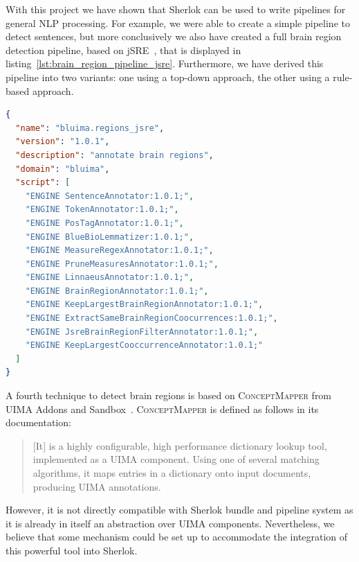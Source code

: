 \documentclass{article}
\newcommand{\ID}[1]{{\textsc{#1}}}
\begin{document}
With this project we have shown that Sherlok can be used to write pipelines for general NLP
processing. For example, we were able to create a simple pipeline to detect sentences, but more
conclusively we also have created a full brain region detection pipeline, based on
jSRE~\cite{jsre_2006}, that is displayed in listing~\ref{lst:brain_region_pipeline_jsre}.
Furthermore, we have derived this pipeline into two variants: one using a top-down approach, the
other using a rule-based approach.

\begin{lstlisting}[float,language=json,
                   caption=jSRE brain region pipeline,
                   label=lst:brain_region_pipeline_jsre]
{
  "name": "bluima.regions_jsre",
  "version": "1.0.1",
  "description": "annotate brain regions",
  "domain": "bluima",
  "script": [
    "ENGINE SentenceAnnotator:1.0.1;",
    "ENGINE TokenAnnotator:1.0.1;",
    "ENGINE PosTagAnnotator:1.0.1;",
    "ENGINE BlueBioLemmatizer:1.0.1;",
    "ENGINE MeasureRegexAnnotator:1.0.1;",
    "ENGINE PruneMeasuresAnnotator:1.0.1;",
    "ENGINE LinnaeusAnnotator:1.0.1;",
    "ENGINE BrainRegionAnnotator:1.0.1;",
    "ENGINE KeepLargestBrainRegionAnnotator:1.0.1;",
    "ENGINE ExtractSameBrainRegionCoocurrences:1.0.1;",
    "ENGINE JsreBrainRegionFilterAnnotator:1.0.1;",
    "ENGINE KeepLargestCooccurrenceAnnotator:1.0.1;"
  ]
}
\end{lstlisting}

A fourth technique to detect brain regions is based on \ID{ConceptMapper} from UIMA Addons and
Sandbox~\cite{uima_sandbox}. \ID{ConceptMapper} is defined as follows in its documentation:

\begin{quotation}
    [It] is a highly configurable, high performance dictionary lookup tool, implemented as a UIMA
    component. Using one of several matching algorithms, it maps entries in a dictionary onto input
    documents, producing UIMA annotations.
\end{quotation}

However, it is not directly compatible with Sherlok bundle and pipeline system as it is already in
itself an abstraction over UIMA components. Nevertheless, we believe that some mechanism could be
set up to accommodate the integration of this powerful tool into Sherlok.
\end{document}

